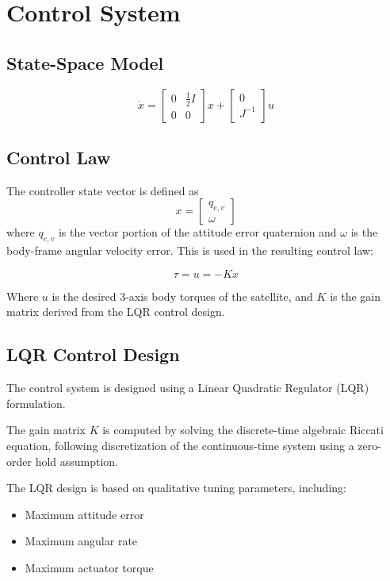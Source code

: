 \chapter{Control System}

\section{State-Space Model}

\[
\dot{x} =
\begin{bmatrix}
	0 & \frac{1}{2}I \\
	0 & 0
\end{bmatrix} x +
\begin{bmatrix}
	0 \\
	J^{-1}
\end{bmatrix} u
\]

\section{Control Law}

The controller state vector is defined as
\[
x =
\begin{bmatrix}
	q_{e,v} \\
	\omega
\end{bmatrix}
\]
where \(q_{e,v}\) is the vector portion of the attitude error quaternion and \(\omega\) is the body-frame angular velocity error. This is used in the resulting control law:

\[
\tau = u = -Kx
\]

Where \(u\) is the desired 3-axis body torques of the satellite, and \(K\) is the gain matrix derived from the LQR control design.

\section{LQR Control Design}

The control system is designed using a Linear Quadratic Regulator (LQR) formulation.

The gain matrix $K$ is computed by solving the discrete-time algebraic Riccati equation, following discretization of the continuous-time system using a zero-order hold assumption.

The LQR design is based on qualitative tuning parameters, including:

\begin{itemize}
	\item Maximum attitude error
	\item Maximum angular rate
	\item Maximum actuator torque
\end{itemize}

